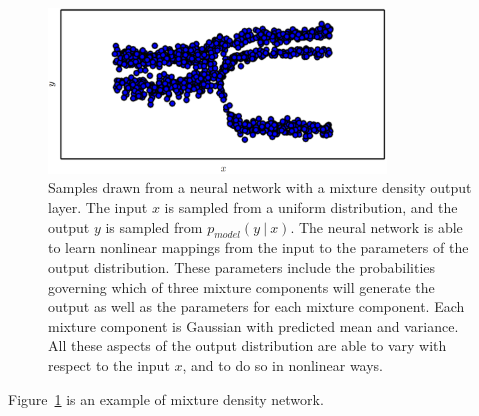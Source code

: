 \begin{itemize}
    \newpage

    \setcounter{figure}{3}
    \begin{figure}[ht]
      \begin{center}
        \includegraphics[width=0.8\textwidth]{FIG/fig6_4.PNG}
        \caption{Samples drawn from a neural network with a mixture density output layer.
          The input $x$ is sampled from a uniform distribution,
          and the output $y$ is sampled from $p _ {model} (y\ |\ x)$.
          The neural network is able to learn nonlinear mappings from the input to the parameters of the output distribution.
          These parameters include the probabilities governing which of three mixture components will generate the output as well as the parameters for each mixture component.
          Each mixture component is Gaussian with predicted mean and variance.
          All these aspects of the output distribution are able to vary with respect to the input $x$,
          and to do so in nonlinear ways.
        }\label{fig:NN_mixture_density_output_layer}
      \end{center}
    \end{figure}

    Figure~\ref{fig:NN_mixture_density_output_layer} is an example of mixture density network.

  \end{itemize}

